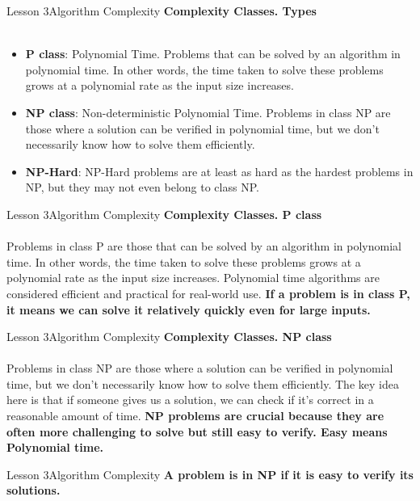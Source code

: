 \documentclass[aspectratio=1610]{beamer}
\begin{document}
\begin{frame}{Lesson 3}{Algorithm Complexity}
\LARGE
\textbf{Complexity Classes. Types}\\~\\
\Large
\begin{itemize}
	\item \textbf{P class}: Polynomial Time. Problems that can be solved by an algorithm in polynomial time. In other words, the time taken to solve these problems grows at a polynomial rate as the input size increases.
	\item \textbf{NP class}: Non-deterministic Polynomial Time. Problems in class NP are those where a solution can be verified in polynomial time, but we don’t necessarily know how to solve them efficiently.	
    \item \textbf{NP-Hard}: NP-Hard problems are at least as hard as the hardest problems in NP, but they may not even belong to class NP.
\end{itemize}
\end{frame}


\begin{frame}{Lesson 3}{Algorithm Complexity}
\LARGE
\textbf{Complexity Classes. P class}\\~\\
\Large
Problems in class P are those that can be solved by an algorithm in polynomial
time. In other words, the time taken to solve these problems grows at a polynomial
rate as the input size increases. Polynomial time algorithms are considered
efficient and practical for real-world use. 
\textbf{If a problem is in class P, it means we can solve it relatively quickly
even for large inputs.}
\end{frame}


\begin{frame}{Lesson 3}{Algorithm Complexity}
\LARGE
\textbf{Complexity Classes. NP class}\\~\\
\Large
Problems in class NP are those where a solution can be verified in polynomial
time, but we don’t necessarily know how to solve them efficiently. The key idea
here is that if someone gives us a solution, we can check if it’s correct in a
reasonable amount of time.
\textbf{NP problems are crucial because they are often more challenging to solve
but still easy to verify. Easy means Polynomial time.}
\end{frame}



\begin{frame}{Lesson 3}{Algorithm Complexity}
\LARGE
\textbf{A problem is in NP if it is easy to verify its solutions.}
\end{frame}
\end{document}
